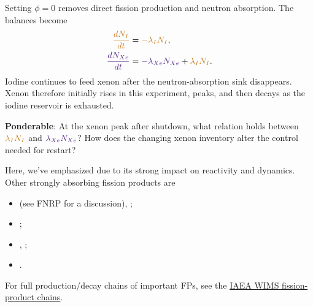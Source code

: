 \documentclass{ne630handout}
\begin{document}
Setting $\phi=0$ removes direct fission production and neutron
absorption. The balances become
\begin{align*}
 \Alert{\frac{dN_I}{dt}}&=\Alert{-\lambda_I N_I},\\
 \Primary{\frac{dN_{Xe}}{dt}}&=\Primary{-\lambda_{Xe}N_{Xe}}
                              +\Alert{\lambda_I N_I}.
\end{align*}
Iodine continues to feed xenon after the neutron-absorption sink
disappears. Xenon therefore initially rises in this experiment, peaks,
and then decays as the iodine reservoir is exhausted.

\vspace{5pt}

{\bf Ponderable}:
At the xenon peak after shutdown, what relation holds between
$\Alert{\lambda_I N_I}$ and $\Primary{\lambda_{Xe}N_{Xe}}$?
How does the changing xenon inventory alter the control needed for restart?
 
\vspace{5pt}


Here, we've emphasized  due to its strong impact 
on reactivity and dynamics.
Other strongly absorbing fission products  are
\begin{itemize}
 \item {} (see FNRP for a discussion), ;
 \item {};
 \item {}, ;
 \item {}.
\end{itemize}
For full production/decay chains of important FPs, see the
\href{https://www-nds.iaea.org/wimsd/fpbchains.htm}{IAEA WIMS fission-product chains}.

\colend
\end{document}
